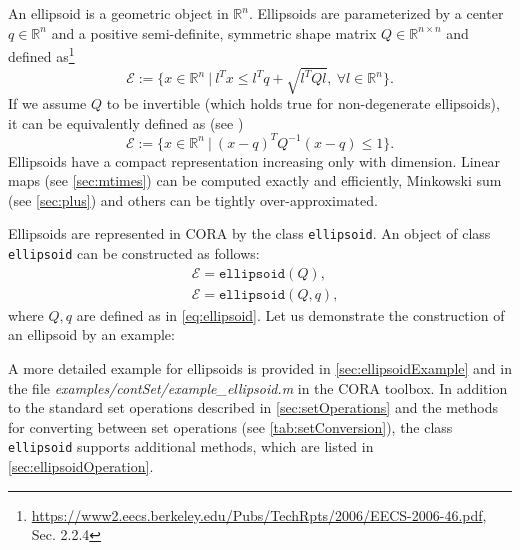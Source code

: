  \label{sec:ellipsoids}

An ellipsoid is a geometric object in $\mathbb{R}^n$. Ellipsoids are parameterized by a center $q \in \mathbb{R}^n$ and a positive semi-definite, symmetric shape matrix $Q\in \mathbb{R}^{n\times n}$ and defined as\footnote{\href{Ellipsoidal Toolbox (Technical Report)}{https://www2.eecs.berkeley.edu/Pubs/TechRpts/2006/EECS-2006-46.pdf},  Sec. 2.2.4}
\begin{equation} \label{eq:ellipsoid}
	\mathcal{E} := \Big\{x\in \mathbb{R}^n ~ \Big| ~ l^Tx \leq l^Tq + \sqrt{l^TQl}, \ \forall l \in \mathbb{R}^n \Big \}.
\end{equation}
If we assume $Q$ to be invertible (which holds true for non-degenerate ellipsoids), it can be equivalently defined as (see \cite[Definition 2.1.3]{Kurzhanskiy2006})
\begin{equation*}
	\mathcal{E} := \Big\{ x\in \mathbb{R}^n ~ \Big| ~ \left(x-q\right)^T Q^{-1}\left(x-q\right)\leq 1 \Big \}.
\end{equation*}
Ellipsoids have a compact representation increasing only with dimension. Linear maps (see \cref{sec:mtimes}) can be computed exactly and efficiently, Minkowski sum (see \cref{sec:plus}) and others can be tightly over-approximated.

Ellipsoids are represented in CORA by the class \texttt{ellipsoid}. An object of class \texttt{ellipsoid} can be constructed as follows:
\begin{equation*}
	\begin{split}
		& \mathcal{E} = \texttt{ellipsoid}(Q), \\
		& \mathcal{E} = \texttt{ellipsoid}(Q,q),
	\end{split}
\end{equation*}
where $Q,q$ are defined as in \eqref{eq:ellipsoid}. Let us demonstrate the construction of an ellipsoid by an example:

\begin{center}
\begin{minipage}[t]{0.35\textwidth}
	\vspace{30pt}
	\footnotesize
	
\end{minipage}
\begin{minipage}[t]{0.3\textwidth}
	\vspace{0pt}
	\centering
\end{minipage}
\end{center}

A more detailed example for ellipsoids is provided in \cref{sec:ellipsoidExample} and in the file \textit{examples/contSet/example\_ellipsoid.m} in the CORA toolbox. In addition to the standard set operations described in \cref{sec:setOperations} and the methods for converting between set operations (see \cref{tab:setConversion}), the class \texttt{ellipsoid} supports additional methods, which are listed in \cref{sec:ellipsoidOperation}.

